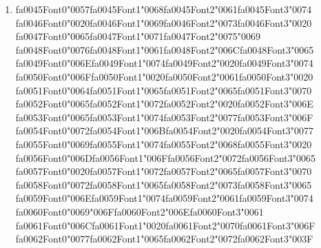 \documentclass[12pt]{article}
\begin{document}
\begin{enumerate}[label=Q\arabic*.]
\item {\csname fa0045Font0\endcsname\char"0057}{\csname fa0045Font1\endcsname\char"0068}{\csname fa0045Font2\endcsname\char"0061}{\csname fa0045Font3\endcsname\char"0074} {\csname fa0046Font0\endcsname\char"0020}{\csname fa0046Font1\endcsname\char"0069}{\csname fa0046Font2\endcsname\char"0073}{\csname fa0046Font3\endcsname\char"0020} {\csname fa0047Font0\endcsname\char"0065}{\csname fa0047Font1\endcsname\char"0071}{\csname fa0047Font2\endcsname\char"0075}{\char"0069} {\csname fa0048Font0\endcsname\char"0076}{\csname fa0048Font1\endcsname\char"0061}{\csname fa0048Font2\endcsname\char"006C}{\csname fa0048Font3\endcsname\char"0065} {\csname fa0049Font0\endcsname\char"006E}{\csname fa0049Font1\endcsname\char"0074}{\csname fa0049Font2\endcsname\char"0020}{\csname fa0049Font3\endcsname\char"0074} {\csname fa0050Font0\endcsname\char"006F}{\csname fa0050Font1\endcsname\char"0020}{\csname fa0050Font2\endcsname\char"0061}{\csname fa0050Font3\endcsname\char"0020} {\csname fa0051Font0\endcsname\char"0064}{\csname fa0051Font1\endcsname\char"0065}{\csname fa0051Font2\endcsname\char"0065}{\csname fa0051Font3\endcsname\char"0070} {\csname fa0052Font0\endcsname\char"0065}{\csname fa0052Font1\endcsname\char"0072}{\csname fa0052Font2\endcsname\char"0020}{\csname fa0052Font3\endcsname\char"006E} {\csname fa0053Font0\endcsname\char"0065}{\csname fa0053Font1\endcsname\char"0074}{\csname fa0053Font2\endcsname\char"0077}{\csname fa0053Font3\endcsname\char"006F} {\csname fa0054Font0\endcsname\char"0072}{\csname fa0054Font1\endcsname\char"006B}{\csname fa0054Font2\endcsname\char"0020}{\csname fa0054Font3\endcsname\char"0077} {\csname fa0055Font0\endcsname\char"0069}{\csname fa0055Font1\endcsname\char"0074}{\csname fa0055Font2\endcsname\char"0068}{\csname fa0055Font3\endcsname\char"0020} {\csname fa0056Font0\endcsname\char"006D}{\csname fa0056Font1\endcsname\char"006F}{\csname fa0056Font2\endcsname\char"0072}{\csname fa0056Font3\endcsname\char"0065} {\csname fa0057Font0\endcsname\char"0020}{\csname fa0057Font1\endcsname\char"0072}{\csname fa0057Font2\endcsname\char"0065}{\csname fa0057Font3\endcsname\char"0070} {\csname fa0058Font0\endcsname\char"0072}{\csname fa0058Font1\endcsname\char"0065}{\csname fa0058Font2\endcsname\char"0073}{\csname fa0058Font3\endcsname\char"0065} {\csname fa0059Font0\endcsname\char"006E}{\csname fa0059Font1\endcsname\char"0074}{\csname fa0059Font2\endcsname\char"0061}{\csname fa0059Font3\endcsname\char"0074} {\csname fa0060Font0\endcsname\char"0069}{\char"006F}{\csname fa0060Font2\endcsname\char"006E}{\csname fa0060Font3\endcsname\char"0061} {\csname fa0061Font0\endcsname\char"006C}{\csname fa0061Font1\endcsname\char"0020}{\csname fa0061Font2\endcsname\char"0070}{\csname fa0061Font3\endcsname\char"006F} {\csname fa0062Font0\endcsname\char"0077}{\csname fa0062Font1\endcsname\char"0065}{\csname fa0062Font2\endcsname\char"0072}{\csname fa0062Font3\endcsname\char"003F}

\end{enumerate}
\end{document}
